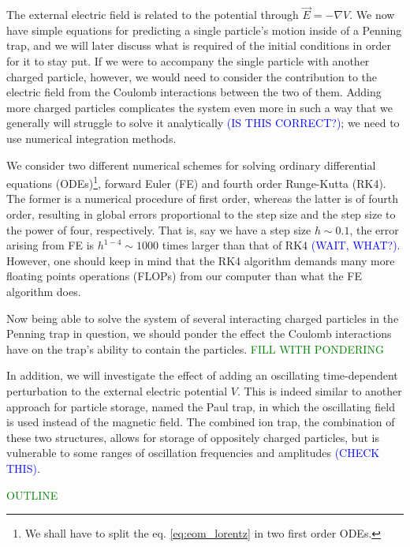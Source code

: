 The external electric field is related to the potential through $\vec{E} = -\nabla V$. We now have simple equations for predicting a single particle's motion inside of a Penning trap, and we will later discuss what is required of the initial conditions in order for it to stay put. If we were to accompany the single particle with another charged particle, however, we would need to consider the contribution to the electric field from the Coulomb interactions between the two of them. Adding more charged particles complicates the system even more in such a way that we generally will struggle to solve it analytically \textcolor{blue}{(IS THIS CORRECT?)}; we need to use numerical integration methods. 

We consider two different numerical schemes for solving ordinary differential equations (ODEs)\footnote{We shall have to split the eq. \eqref{eq:eom_lorentz} in two first order ODEs.}, forward Euler (FE) and fourth order Runge-Kutta (RK4). The former is a numerical procedure of first order, whereas the latter is of fourth order, resulting in global errors proportional to the step size and the step size to the power of four, respectively. That is, say we have a step size $h\sim 0.1$, the error arising from FE is $h^{1-4} \sim 1000$ times larger than that of RK4 \textcolor{blue}{(WAIT, WHAT?)}. However, one should keep in mind that the RK4 algorithm demands many more floating points operations (FLOPs) from our computer than what the FE algorithm does.

Now being able to solve the system of several interacting charged particles in the Penning trap in question, we should ponder the effect the Coulomb interactions have on the trap's ability to contain the particles. 
\textcolor{green}{FILL WITH PONDERING}

In addition, we will investigate the effect of adding an oscillating time-dependent perturbation to the external electric potential $V$. This is indeed similar to another approach for particle storage, named the Paul trap, in which the oscillating field is used instead of the magnetic field. The combined ion trap, the combination of these two structures, allows for storage of oppositely charged particles, but is vulnerable to some ranges of oscillation frequencies and amplitudes \textcolor{blue}{(CHECK THIS)}.

\textcolor{green}{OUTLINE}



